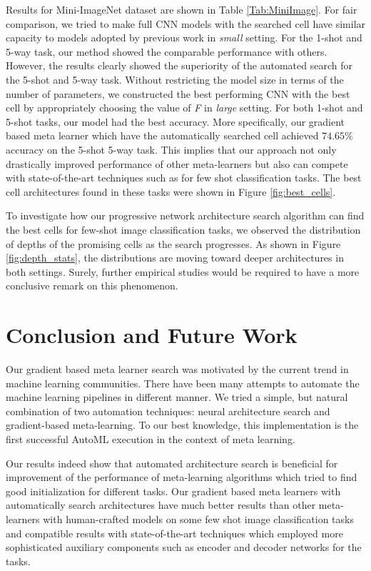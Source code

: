 \documentclass{article}
\begin{document}
Results for Mini-ImageNet dataset are shown in Table \ref{Tab:MiniImage}. For fair comparison, we tried to make full CNN models with the searched cell have similar capacity to models adopted by previous work in \textit{small} setting. For the 1-shot and 5-way task, our method showed the comparable performance with others. However, the results clearly showed the superiority of the automated search for the 5-shot and 5-way task. Without restricting the model size in terms of the number of parameters, we constructed the best performing CNN with the best cell by appropriately choosing the value of \textit{F} in \textit{large} setting. For both 1-shot and 5-shot tasks, our model had the best accuracy. More specifically, our gradient based meta learner which have the automatically searched cell achieved $74.65\%$ accuracy on the 5-shot 5-way task. This implies that our approach not only drastically improved performance of other meta-learners but also can compete with state-of-the-art techniques such as \cite{Rusu2018} for few shot classification tasks. The best cell architectures found in these tasks were shown in Figure \ref{fig:best_cells}.


To investigate how our progressive network architecture search algorithm can find the best cells for few-shot image classification tasks, we observed the distribution of depths of the promising cells as the search progresses. As shown in Figure \ref{fig:depth_stats}, the distributions are moving toward deeper architectures in both settings. Surely, further empirical studies would be required to have a more conclusive remark on this phenomenon.
\section{Conclusion and Future Work}
Our gradient based meta learner search was motivated by the current trend in machine learning communities. There have been many attempts to automate the machine learning pipelines in different manner. We tried a simple, but natural combination of two automation techniques: neural architecture search and gradient-based meta-learning. To our best knowledge, this implementation is the first successful AutoML execution in the context of meta learning.

Our results indeed show that automated architecture search is beneficial for improvement of the performance of meta-learning algorithms which tried to find good initialization for different tasks. Our gradient based meta learners with automatically search architectures have much better results than other meta-learners with human-crafted models on some few shot image classification tasks and compatible results with state-of-the-art techniques which employed more sophisticated auxiliary components such as encoder and decoder networks for the tasks.
\end{document}
